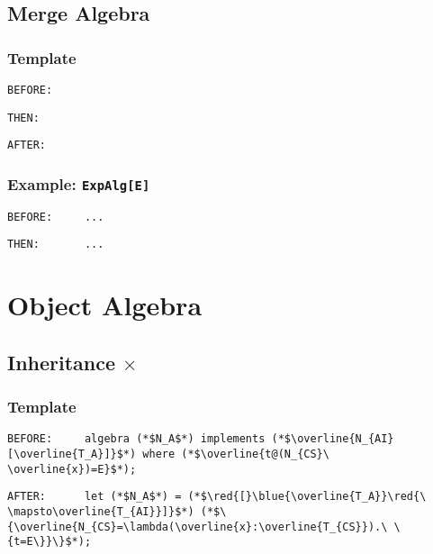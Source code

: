 \documentclass{article}
\newcommand{\red}[1]{\textcolor{red}{#1}}
\newcommand{\blue}[1]{\textcolor{blue}{#1}}
\begin{document}
\begin{spacing}{1.1}
\subsection{Merge Algebra}

\subsubsection{Template}

\begin{lstlisting}[numbers=none]
BEFORE:     
\end{lstlisting}
\begin{lstlisting}[numbers=none]
THEN:       
\end{lstlisting}
\begin{lstlisting}[numbers=none]
AFTER:      
\end{lstlisting}

\subsubsection{Example: \lstinline{ExpAlg[E]}}

\begin{lstlisting}[numbers=none]
BEFORE:     ...
\end{lstlisting}
\begin{lstlisting}[numbers=none]
THEN:       ...
\end{lstlisting}

\section{Object Algebra}

\subsection{Inheritance $\times$}

\subsubsection{Template}

\begin{lstlisting}[numbers=none]
BEFORE:     algebra (*$N_A$*) implements (*$\overline{N_{AI}[\overline{T_A}]}$*) where (*$\overline{t@(N_{CS}\ \overline{x})=E}$*);
\end{lstlisting}
\begin{lstlisting}[numbers=none]
AFTER:      let (*$N_A$*) = (*$\red{[}\blue{\overline{T_A}}\red{\ \mapsto\overline{T_{AI}}]}$*) (*$\{\overline{N_{CS}=\lambda(\overline{x}:\overline{T_{CS}}).\ \{t=E\}}\}$*);
\end{lstlisting}


\end{spacing}
\end{document}
